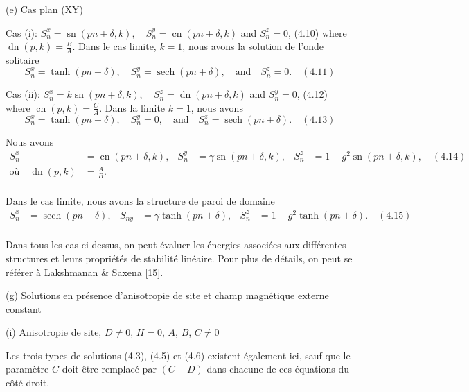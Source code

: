 \documentclass{article}
\begin{document}
   (e) Cas plan (XY)
   
   Cas (i): $S_{n}^{x} = \operatorname{sn}(pn + \delta, k), \quad S_{n}^{y} = \operatorname{cn}(pn + \delta, k)$ and $S_{n}^{z} = 0$, \quad (4.10)
   where $\operatorname{dn}(p, k) = \frac{B}{A}$. Dans le cas limite, $k = 1$, nous avons la solution de l'onde solitaire
  \[
  S_{n}^{x} = \tanh(pn + \delta), \quad S_{n}^{y} = \operatorname{sech}(pn + \delta), \quad \text{and} \quad S_{n}^{z} = 0. \quad (4.11)
  \]
   
   Cas (ii): $S_{n}^{x} = k\operatorname{sn}(pn + \delta, k), \quad S_{n}^{z} = \operatorname{dn}(pn + \delta, k)$ and $S_{n}^{y} = 0$, \quad (4.12) \newline \newline
   where $\operatorname{cn}(p, k) = \frac{C}{A}$. Dans la limite $k = 1$, nous avons
    \[
   S_{n}^{x} = \tanh(pn + \delta), \quad S_{n}^{y} = 0, \quad \text{and} \quad S_{n}^{z} = \operatorname{sech}(pn + \delta). \quad (4.13)
   \]
   
   Nous avons
   \begin{align*}
   S_{n}^{x} &= \operatorname{cn}(pn + \delta, k), & S_{n}^{y} &= \gamma \operatorname{sn}(pn + \delta, k), & S_{n}^{z} &= 1 - g^2 \operatorname{sn}(pn + \delta, k), \quad (4.14) \\
   \text{où} \quad \operatorname{dn}(p, k) &= \frac{A}{B}. \nonumber \\
   \end{align*}
   
   Dans le cas limite, nous avons la structure de paroi de domaine
  \begin{align*}
  S_{n}^{x} &= \operatorname{sech}(pn + \delta), & S_{ny} &= \gamma \tanh(pn + \delta), & S_{n}^{z} &= 1 - g^2 \tanh(pn + \delta). \quad (4.15) \nonumber \\
  \end{align*}
   
   Dans tous les cas ci-dessus, on peut évaluer les énergies associées aux différentes structures et leurs propriétés de stabilité linéaire. Pour plus de détails, on peut se référer à Lakshmanan \& Saxena [15].
   
   (g) Solutions en présence d'anisotropie de site et champ magnétique externe constant
   
   (i) Anisotropie de site, $D \neq 0$, $H = 0$, $A$, $B$, $C \neq 0$
   
   Les trois types de solutions (4.3), (4.5) et (4.6) existent également ici, sauf que le paramètre $C$ doit être remplacé par $(C - D)$ dans chacune de ces équations du côté droit.
   
\end{document}
